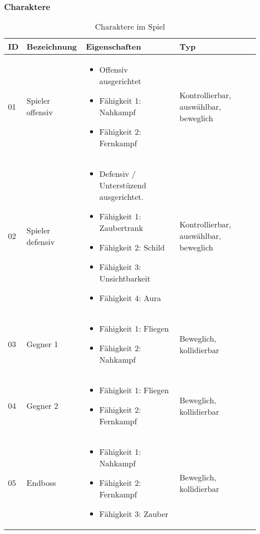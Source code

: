 \documentclass[11pt]{article}
\begin{document}
\subsubsection*{Charaktere}
\begin{table}[htbp]
\centering
\begin{tabular}{|p{}|p{}|p{}|p{}|}
\hline
\textbf{ID} & \textbf{Bezeichnung} & \textbf{Eigenschaften} & \textbf{Typ}\\
\hline
01 & Spieler offensiv &
\begin{itemize}
    \item Offensiv ausgerichtet
    \item Fähigkeit 1: Nahkampf
    \item Fähigkeit 2: Fernkampf
\end{itemize} & Kontrollierbar, auswählbar, beweglich \\
\hline
02 & Spieler defensiv &
\begin{itemize}
    \item Defensiv / Unterstüzend ausgerichtet.
    \item Fähigkeit 1: Zaubertrank
    \item Fähigkeit 2: Schild
    \item Fähigkeit 3: Unsichtbarkeit
    \item Fähigkeit 4: Aura
\end{itemize} & Kontrollierbar, auswählbar, beweglich \\
\hline
03 & Gegner 1 & 
\begin{itemize}
    \item Fähigkeit 1: Fliegen
    \item Fähigkeit 2: Nahkampf
\end{itemize} & Beweglich, kollidierbar \\
\hline
04 & Gegner 2 & 
\begin{itemize}
    \item Fähigkeit 1: Fliegen
    \item Fähigkeit 2: Fernkampf
\end{itemize} & Beweglich, kollidierbar \\
\hline
05 & Endboss & 
\begin{itemize}
    \item Fähigkeit 1: Nahkampf
    \item Fähigkeit 2: Fernkampf
    \item Fähigkeit 3: Zauber
\end{itemize} & Beweglich, kollidierbar \\
\hline
\end{tabular}
\caption{Charaktere im Spiel}
\end{table}
\end{document}
